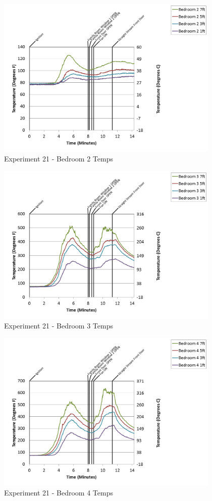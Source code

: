 \documentclass{article}
\begin{document}
\begin{appendices}
\begin{figure}[h!]
	\centering
	\includegraphics[height=3.05in]{0_Images/Results_Charts/Exp_21_Charts/Bedroom2Temps.png}
	\caption{Experiment 21 - Bedroom 2 Temps}
\end{figure}

\clearpage

\begin{figure}[h!]
	\centering
	\includegraphics[height=3.05in]{0_Images/Results_Charts/Exp_21_Charts/Bedroom3Temps.png}
	\caption{Experiment 21 - Bedroom 3 Temps}
\end{figure}


\begin{figure}[h!]
	\centering
	\includegraphics[height=3.05in]{0_Images/Results_Charts/Exp_21_Charts/Bedroom4Temps.png}
	\caption{Experiment 21 - Bedroom 4 Temps}
\end{figure}


\end{appendices}
\end{document}
